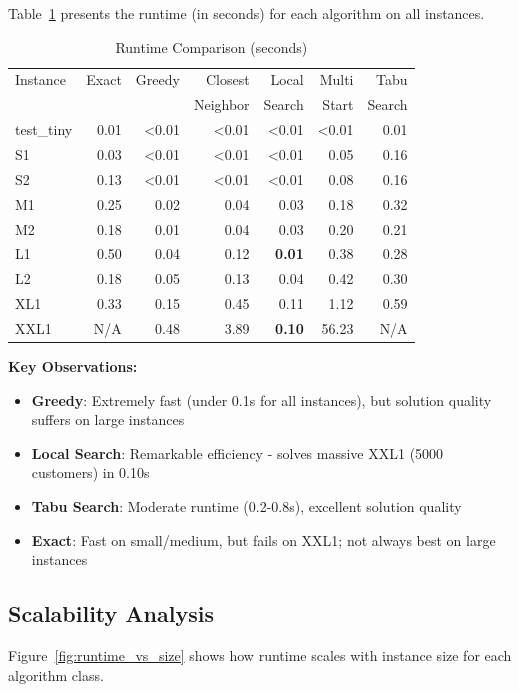 \documentclass[11pt,a4paper]{article}
\begin{document}
Table~\ref{tab:runtime} presents the runtime (in seconds) for each algorithm on all instances.

\begin{table}[h]
\centering
\caption{Runtime Comparison (seconds)}
\label{tab:runtime}
\small
\begin{tabular}{lrrrrrr}
\toprule
Instance & Exact & Greedy & Closest & Local & Multi & Tabu \\
& & & Neighbor & Search & Start & Search \\
\midrule
test\_tiny & 0.01 & \textless0.01 & \textless0.01 & \textless0.01 & \textless0.01 & 0.01 \\
S1 & 0.03 & \textless0.01 & \textless0.01 & \textless0.01 & 0.05 & 0.16 \\
S2 & 0.13 & \textless0.01 & \textless0.01 & \textless0.01 & 0.08 & 0.16 \\
M1 & 0.25 & 0.02 & 0.04 & 0.03 & 0.18 & 0.32 \\
M2 & 0.18 & 0.01 & 0.04 & 0.03 & 0.20 & 0.21 \\
L1 & 0.50 & 0.04 & 0.12 & \textbf{0.01} & 0.38 & 0.28 \\
L2 & 0.18 & 0.05 & 0.13 & 0.04 & 0.42 & 0.30 \\
XL1 & 0.33 & 0.15 & 0.45 & 0.11 & 1.12 & 0.59 \\
XXL1 & N/A & 0.48 & 3.89 & \textbf{0.10} & 56.23 & N/A \\
\bottomrule
\end{tabular}
\end{table}

\textbf{Key Observations:}
\begin{itemize}
  \item \textbf{Greedy}: Extremely fast (under 0.1s for all instances), but solution quality suffers on large instances
  \item \textbf{Local Search}: Remarkable efficiency - solves massive XXL1 (5000 customers) in 0.10s
  \item \textbf{Tabu Search}: Moderate runtime (0.2-0.8s), excellent solution quality
  \item \textbf{Exact}: Fast on small/medium, but fails on XXL1; not always best on large instances
\end{itemize}

\subsection{Scalability Analysis}

Figure~\ref{fig:runtime_vs_size} shows how runtime scales with instance size for each algorithm class.
\end{document}
